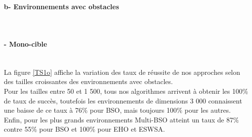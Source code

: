 	\paragraph{b- Environnements avec obstacles}
	\textbf{}\\
	\noindent
	\begin{minipage}[t]{0.5\textwidth}
		\paragraph{- Mono-cible}
		\textbf{}\\
		La figure \ref{TS1o} affiche la variation des taux de réussite de nos approches selon des tailles croissantes des environnements avec obstacles.\\
		
		Pour les tailles entre 50 et 1 500, tous nos algorithmes arrivent à obtenir les 100\% de taux de succès, toutefois les environnements de dimensions 3 000  connaissent une baisse de ce taux à 76\% pour BSO, mais toujours 100\% pour les autres. Enfin, pour les plus grands environnements Multi-BSO atteint un taux de 87\% contre 55\% pour BSO et 100\% pour EHO et ESWSA. 
		
		
		
	\end{minipage}\hfill
	\begin{minipage}[t]{0.55\textwidth}
		\captionsetup{width=0.8\linewidth}
		\centering{}
		\label{TS1o}
	\end{minipage}\hfill
	
	
	
